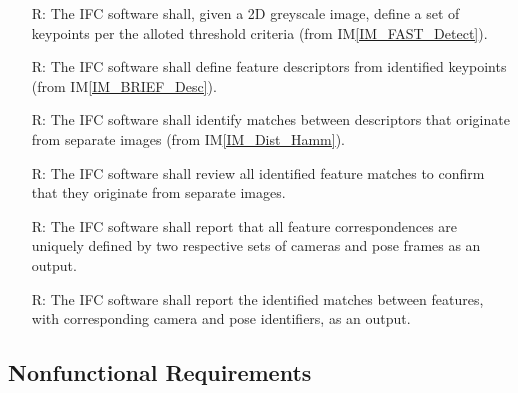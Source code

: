 \documentclass[12pt]{article}
\newcommand{\iref}[1]{IM\ref{#1}}
\newcounter{reqnum} %
\begin{document}
\begin{itemize}
\item[R\refstepcounter{reqnum}\thereqnum \label{R_DetectKeypoints}:] The IFC software shall, given a 2D 
greyscale image, define a set of keypoints per the alloted threshold criteria (from 
\iref{IM_FAST_Detect}).

\item[R\refstepcounter{reqnum}\thereqnum \label{R_DefineDescriptors}:] The IFC software shall 
define feature descriptors from identified keypoints (from \iref{IM_BRIEF_Desc}).

\item[R\refstepcounter{reqnum}\thereqnum \label{R_CompareDescriptors}:] The IFC software shall 
identify matches between descriptors that originate from separate images (from \iref{IM_Dist_Hamm}).

\item[R\refstepcounter{reqnum}\thereqnum \label{R_DistinctImages}:] The IFC software shall review 
all identified feature matches to confirm that they originate from separate images.

\item[R\refstepcounter{reqnum}\thereqnum \label{R_UniqueMatch_IDs}:] The IFC software shall report 
that all feature correspondences are uniquely defined by two respective sets of cameras and pose 
frames as an output.

\item[R\refstepcounter{reqnum}\thereqnum \label{R_OutputCorrespondences}:] The IFC software shall report 
the identified matches between features, with corresponding camera and pose identifiers, as an output.

\end{itemize}

\subsection{Nonfunctional Requirements}
\end{document}

